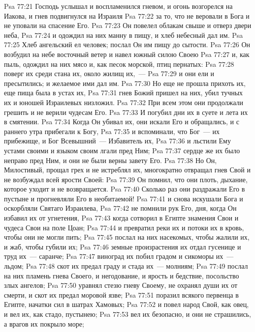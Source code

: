 \vs Psa 77:21 Господь услышал и воспламенился гневом, и огонь возгорелся на Иакова, и гнев подвигнулся на Израиля
\vs Psa 77:22 за то, что не веровали в Бога и не уповали на спасение Его.
\vs Psa 77:23 Он повелел облакам свыше и отверз двери неба,
\vs Psa 77:24 и одождил на них манну в пищу, и хлеб небесный дал им.
\vs Psa 77:25 Хлеб ангельский ел человек; послал Он им пищу до сытости.
\vs Psa 77:26 Он возбудил на небе восточный ветер и навел южный силою Своею
\vs Psa 77:27 и, как пыль, одождил на них мясо и, как песок морской, птиц пернатых:
\vs Psa 77:28 поверг их среди стана их, около жилищ их,~---
\vs Psa 77:29 и они ели и пресытились; и желаемое ими дал им.
\vs Psa 77:30 Но еще не прошла прихоть их, еще пища была в устах их,
\vs Psa 77:31 гнев Божий пришел на них, убил тучных их и юношей Израилевых низложил.
\vs Psa 77:32 При всем этом они продолжали грешить и не верили чудесам Его.
\vs Psa 77:33 И погубил дни их в суете и лета их в смятении.
\vs Psa 77:34 Когда Он убивал их, они искали Его и обращались, и с раннего утра прибегали к Богу,
\vs Psa 77:35 и вспоминали, что Бог~--- их прибежище, и Бог Всевышний~--- Избавитель их,
\vs Psa 77:36 и льстили Ему устами своими и языком своим лгали пред Ним;
\vs Psa 77:37 сердце же их было неправо пред Ним, и они не были верны завету Его.
\vs Psa 77:38 Но Он, Милостивый, прощал грех и не истреблял их, многократно отвращал гнев Свой и не возбуждал всей ярости Своей:
\vs Psa 77:39 Он помнил, что они плоть, дыхание, которое уходит и не возвращается.
\vs Psa 77:40 Сколько раз они раздражали Его в пустыне и прогневляли Его в  необитаемой!
\vs Psa 77:41 и снова искушали Бога и оскорбляли Святаго Израилева,
\vs Psa 77:42 не помнили рук Его, дня, когда Он избавил их от угнетения,
\vs Psa 77:43 когда сотворил в Египте знамения Свои и чудеса Свои на поле Цоан;
\vs Psa 77:44 и превратил реки их и потоки их в кровь, чтобы они не могли пить;
\vs Psa 77:45 послал на них насекомых, чтобы жалили их, и жаб, чтобы губили их;
\vs Psa 77:46 земные произрастения их отдал гусенице и труд их~--- саранче;
\vs Psa 77:47 виноград их побил градом и сикоморы их~--- льдом;
\vs Psa 77:48 скот их предал граду и стада их~--- молниям;
\vs Psa 77:49 послал на них пламень гнева Своего, и негодование, и ярость и бедствие, посольство злых ангелов;
\vs Psa 77:50 уравнял стезю гневу Своему, не охранял души их от смерти, и скот их предал моровой язве;
\vs Psa 77:51 поразил всякого первенца в Египте, начатки сил в шатрах Хамовых;
\vs Psa 77:52 и повел народ Свой, как овец, и вел их, как стадо, пустынею;
\vs Psa 77:53 вел их безопасно, и они не страшились, а врагов их покрыло море;
